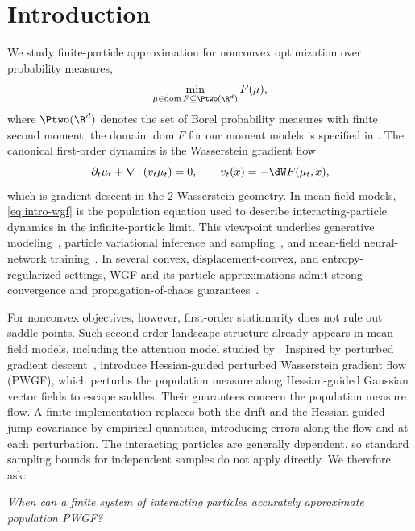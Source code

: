 \section{Introduction}
\label{sec:introduction}

We study finite-particle approximation for nonconvex optimization over probability measures,
\begin{equation}
    \min_{\mu\in\operatorname{dom}F\subseteq\Ptwo(\R^d)} F(\mu),
    \label{eq:measure-optimization}
\end{equation}
where \(\Ptwo(\R^d)\) denotes the set of Borel probability measures with finite second moment;
the domain \(\operatorname{dom}F\) for our moment models is specified in .
The canonical first-order dynamics is the Wasserstein gradient flow
\begin{equation}
    \partial_t \mu_t + \nabla\cdot(v_t\mu_t)=0,
    \qquad
    v_t(x)=-\dW F(\mu_t,x),
    \label{eq:intro-wgf}
\end{equation}
which is gradient descent in the \(2\)-Wasserstein geometry.
In mean-field models, \eqref{eq:intro-wgf} is the population equation used to
describe interacting-particle dynamics in the infinite-particle limit.
This viewpoint underlies generative modeling~\citep{arbel2019,chu2019pfd}, particle variational inference and sampling~\citep{jordan1998,liu2016}, and mean-field neural-network training~\citep{chizat2018,songmei2018,nitanda2022convex}.
In several convex, displacement-convex, and entropy-regularized settings,
WGF and its particle approximations admit strong convergence and propagation-of-chaos
\citep{sznitman1991} guarantees~\citep{chen2025uniform,
suzuki2023uniformintime,nitanda2025propagationensemble,nitanda2022pda}.

For nonconvex objectives, however, first-order stationarity does not rule out
saddle points. Such second-order landscape structure already appears in
mean-field models, including the attention model studied by
\citet{kim2024nonlinear}.
Inspired by perturbed gradient descent~\citep{GeHuangJinYuan2015,pmlr-v75-jin18a},
\citet{yamamoto2025hessianguided} introduce Hessian-guided perturbed Wasserstein
gradient flow (PWGF), which perturbs the population measure along
Hessian-guided Gaussian vector fields to escape saddles. Their guarantees
concern the population measure flow. A finite implementation replaces both the
drift and the Hessian-guided jump covariance by empirical quantities,
introducing errors along the flow and at each perturbation.
The interacting particles are generally dependent, so standard sampling bounds
for independent samples do not apply directly.
We therefore ask:
\begin{center}
\emph{When can a finite system of interacting particles accurately approximate population PWGF?}
\end{center}

